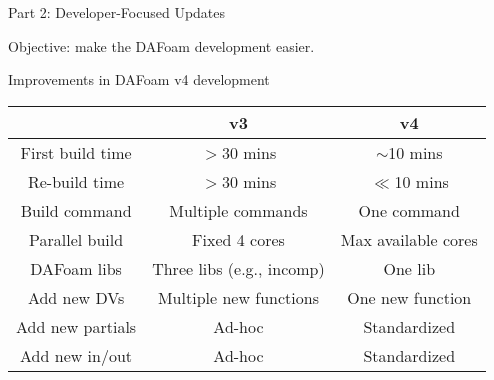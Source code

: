\documentclass{bredelebeamer}
\begin{document}
\begin{frame}{}

  \begin{center}
     \noindent \Large{Part 2: Developer-Focused Updates}
  \end{center}

  \begin{center}
    \noindent \large{Objective: make the DAFoam development easier.}
 \end{center}
  
\end{frame}

\begin{frame}{Improvements in DAFoam v4 development}

\begin{table}
\centering
\begin{tabular}{ccc}
\hline
& v3 & v4 \\
\hline
First build time & $>$30 mins & $\sim$10 mins \\
Re-build time & $>$30 mins & $\ll$10 mins \\
Build command & Multiple commands & One command \\
Parallel build & Fixed 4 cores & Max available cores \\ 
DAFoam libs &  Three libs (e.g., incomp) & One lib \\
Add new DVs & Multiple new functions & One new function \\
Add new partials & Ad-hoc & Standardized \\
Add new in/out & Ad-hoc & Standardized \\

\hline
\end{tabular}
\end{table}

\end{frame}
\end{document}
